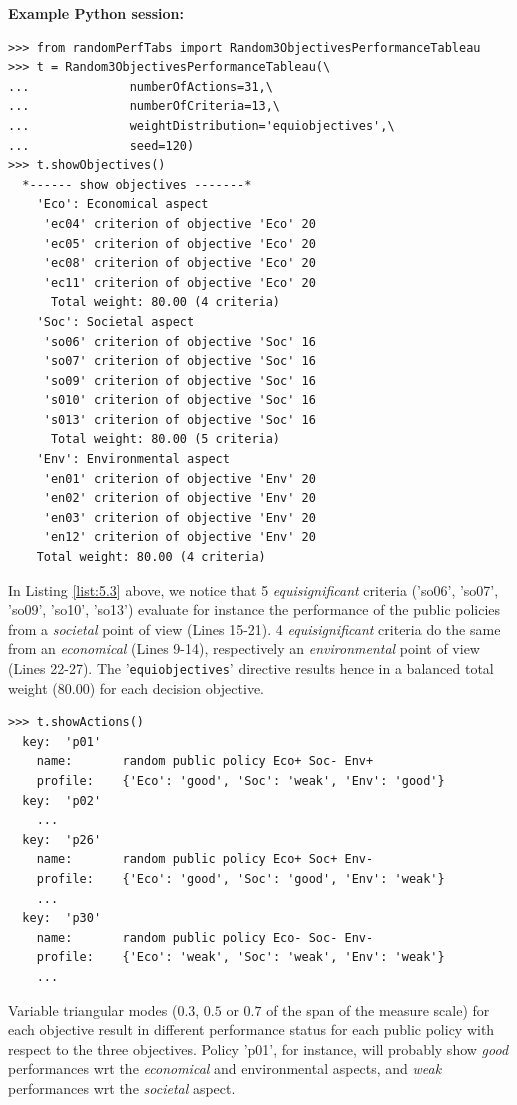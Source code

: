 \noindent \textbf{Example Python session:}
\begin{lstlisting}[caption={Generating a random 3 Objectives performance tableau},label=list:5.3]
>>> from randomPerfTabs import Random3ObjectivesPerformanceTableau
>>> t = Random3ObjectivesPerformanceTableau(\
...              numberOfActions=31,\
...              numberOfCriteria=13,\
...              weightDistribution='equiobjectives',\
...              seed=120)
>>> t.showObjectives()
  *------ show objectives -------*
    'Eco': Economical aspect
     'ec04' criterion of objective 'Eco' 20
     'ec05' criterion of objective 'Eco' 20
     'ec08' criterion of objective 'Eco' 20
     'ec11' criterion of objective 'Eco' 20
      Total weight: 80.00 (4 criteria)
    'Soc': Societal aspect
     'so06' criterion of objective 'Soc' 16
     'so07' criterion of objective 'Soc' 16
     'so09' criterion of objective 'Soc' 16
     's010' criterion of objective 'Soc' 16
     's013' criterion of objective 'Soc' 16
      Total weight: 80.00 (5 criteria)
    'Env': Environmental aspect
     'en01' criterion of objective 'Env' 20
     'en02' criterion of objective 'Env' 20
     'en03' criterion of objective 'Env' 20
     'en12' criterion of objective 'Env' 20
    Total weight: 80.00 (4 criteria)
\end{lstlisting}
In Listing \ref{list:5.3} above, we notice that 5 \emph{equisignificant} criteria ('so06', 'so07', 'so09', 'so10', 'so13') evaluate for instance the performance of the public policies from a \emph{societal} point of view (Lines 15-21). 4 \emph{equisignificant} criteria do the same from an \emph{economical} (Lines 9-14), respectively an \emph{environmental} point of view (Lines 22-27). The '\texttt{equiobjectives}' directive results hence in a balanced total weight (80.00) for each decision objective. 
\begin{lstlisting}
>>> t.showActions()
  key:  'p01'
    name:       random public policy Eco+ Soc- Env+
    profile:    {'Eco': 'good', 'Soc': 'weak', 'Env': 'good'}
  key:  'p02'
    ...
  key:  'p26'
    name:       random public policy Eco+ Soc+ Env-
    profile:    {'Eco': 'good', 'Soc': 'good', 'Env': 'weak'}
    ...
  key:  'p30'
    name:       random public policy Eco- Soc- Env-
    profile:    {'Eco': 'weak', 'Soc': 'weak', 'Env': 'weak'}
    ...
 \end{lstlisting}
  
Variable triangular modes ($0.3$, $0.5$ or $0.7$ of the span of the measure scale) for each objective result in different performance status for each public policy with respect to the three objectives. Policy 'p01', for instance, will probably show \emph{good} performances wrt the \emph{economical}  and environmental aspects, and \emph{weak} performances wrt the \emph{societal} aspect.

